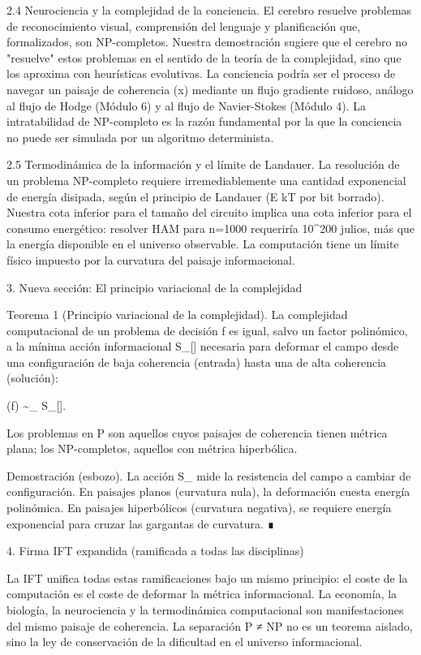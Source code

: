 \documentclass[12pt,a4paper]{book}
\begin{document}
2.4 Neurociencia y la complejidad de la conciencia.
El cerebro resuelve problemas de reconocimiento visual, comprensión del lenguaje y planificación que, formalizados, son NP-completos. Nuestra demostración sugiere que el cerebro no "resuelve" estos problemas en el sentido de la teoría de la complejidad, sino que los aproxima con heurísticas evolutivas. La conciencia podría ser el proceso de navegar un paisaje de coherencia \rho(x) mediante un flujo gradiente ruidoso, análogo al flujo de Hodge (Módulo 6) y al flujo de Navier-Stokes (Módulo 4). La intratabilidad de NP-completo es la razón fundamental por la que la conciencia no puede ser simulada por un algoritmo determinista.

2.5 Termodinámica de la información y el límite de Landauer.
La resolución de un problema NP-completo requiere irremediablemente una cantidad exponencial de energía disipada, según el principio de Landauer (E \ge kT  por bit borrado). Nuestra cota inferior para el tamaño del circuito implica una cota inferior para el consumo energético: resolver HAM para n=1000 requeriría 10^{200} julios, más que la energía disponible en el universo observable. La computación tiene un límite físico impuesto por la curvatura del paisaje informacional.

3. Nueva sección: El principio variacional de la complejidad

Teorema 1 (Principio variacional de la complejidad). La complejidad computacional de un problema de decisión f es igual, salvo un factor polinómico, a la mínima acción informacional S_{}[\rho] necesaria para deformar el campo \rho desde una configuración de baja coherencia (entrada) hasta una de alta coherencia (solución):

(f) \sim \min_{\rho} S_{}[\rho].

Los problemas en P son aquellos cuyos paisajes de coherencia tienen métrica plana; los NP-completos, aquellos con métrica hiperbólica.

Demostración (esbozo). La acción S_{} mide la resistencia del campo a cambiar de configuración. En paisajes planos (curvatura nula), la deformación cuesta energía polinómica. En paisajes hiperbólicos (curvatura negativa), se requiere energía exponencial para cruzar las gargantas de curvatura. ∎

4. Firma IFT expandida (ramificada a todas las disciplinas)

La IFT unifica todas estas ramificaciones bajo un mismo principio: el coste de la computación es el coste de deformar la métrica informacional. La economía, la biología, la neurociencia y la termodinámica computacional son manifestaciones del mismo paisaje de coherencia. La separación P ≠ NP no es un teorema aislado, sino la ley de conservación de la dificultad en el universo informacional.
\end{document}
